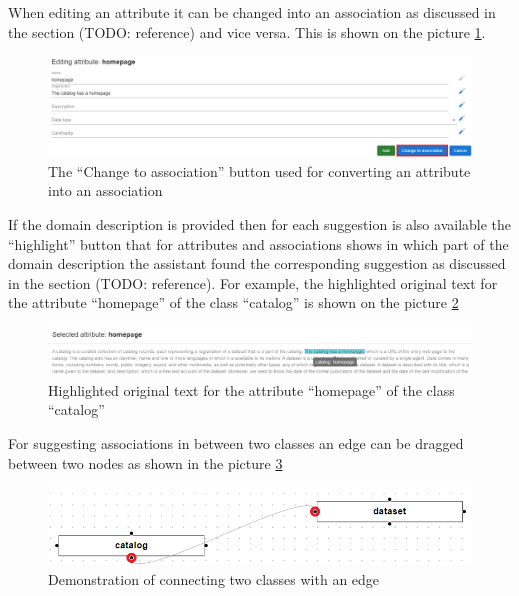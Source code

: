 When editing an attribute it can be changed into an association as discussed in the section (TODO: reference) and vice versa. This is shown on the picture \ref{fig:change_to_association}.

\begin{figure}[!h]
    \includegraphics[scale=0.36]{../docs/images/frontend/change-to-association.png}
    \caption{\centering The ``Change to association'' button used for converting an attribute into an association}
    \label{fig:change_to_association}
\end{figure}

If the domain description is provided then for each suggestion is also available the ``highlight'' button that for attributes and associations shows in which part of the domain description the assistant found the corresponding suggestion as discussed in the section (TODO: reference). For example, the highlighted original text for the attribute ``homepage'' of the class ``catalog'' is shown on the picture \ref{fig:highlight_original_text}

\begin{figure}[!h]
    \includegraphics[scale=0.36]{../docs/images/frontend/highlight-original-text.png}
    \caption{\centering Highlighted original text for the attribute ``homepage'' of the class ``catalog''}
    \label{fig:highlight_original_text}
\end{figure}

For suggesting associations in between two classes an edge can be dragged between two nodes as shown in the picture \ref{fig:edge_drag}

\begin{figure}[!h]
    \includegraphics[scale=0.4]{../docs/images/frontend/edge-drag.png}
    \caption{\centering Demonstration of connecting two classes with an edge}
    \label{fig:edge_drag}
\end{figure}

